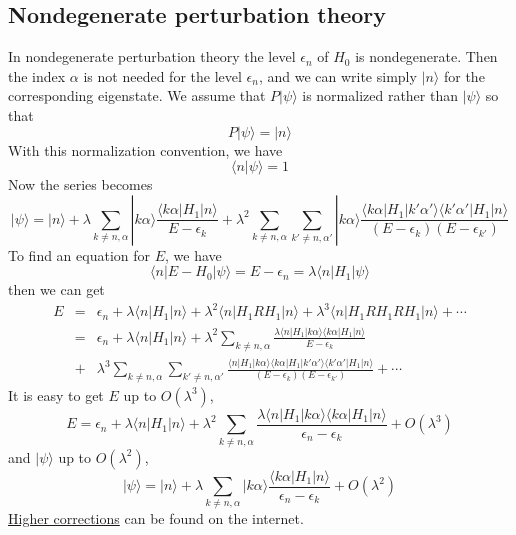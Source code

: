 \documentclass[cyan]{elegantnote}
\begin{document}
\subsection{Nondegenerate perturbation theory}
In nondegenerate perturbation theory the level $\epsilon_n$ of $H_0$ is nondegenerate. Then the index $\alpha$ is not needed for the level $\epsilon_n$, and we can write simply $|n\rangle$ for the corresponding eigenstate. We assume that $P|\psi\rangle$ is normalized rather than $|\psi\rangle$ so that
\[P|\psi\rangle  = |n\rangle\]
With this normalization convention, we have
\[\langle n | \psi \rangle = 1\]
Now the series becomes
\[|\psi\rangle = |n\rangle + \lambda \sum_{k\neq n,\alpha} |k\alpha\rangle \frac{\langle k\alpha | H_1 | n \rangle}{E-\epsilon_k} + \lambda^2 \sum_{k\neq n,\alpha} \sum_{k'\neq n,\alpha'} |k\alpha\rangle \frac{\langle k\alpha | H_1 | k'\alpha' \rangle \langle k'\alpha' | H_1 | n \rangle}{(E-\epsilon_k)(E-\epsilon_{k'})}\]
To find an equation for $E$, we have
\[\langle n | E-H_0 | \psi\rangle = E-\epsilon_n = \lambda \langle n | H_1 | \psi\rangle\]
then we can get
\begin{eqnarray}
E &=& \epsilon_n + \lambda \langle n | H_1 | n\rangle + \lambda^2 \langle n | H_1RH_1 | n\rangle + \lambda^3 \langle n | H_1RH_1RH_1 | n\rangle + \cdots \nonumber \\
&=& \epsilon_n 
+ \lambda \langle n | H_1|n\rangle 
+ \lambda^2 \sum_{k\neq n,\alpha}  \frac{\lambda \langle n | H_1|k\alpha\rangle \langle k\alpha | H_1 | n \rangle}{E-\epsilon_k} \nonumber \\
&+& \lambda^3 \sum_{k\neq n,\alpha} \sum_{k'\neq n,\alpha'} \frac{\langle n | H_1 |k\alpha\rangle \langle k\alpha | H_1 | k'\alpha' \rangle \langle k'\alpha' | H_1 | n \rangle}{(E-\epsilon_k)(E-\epsilon_{k'})} + \cdots \nonumber
\end{eqnarray}
It is easy to get $E$ up to $O(\lambda^3)$,
\[E = \epsilon_n  + \lambda \langle n | H_1|n\rangle  + \lambda^2 \sum_{k\neq n,\alpha}  \frac{\lambda \langle n | H_1|k\alpha\rangle \langle k\alpha | H_1 | n \rangle}{\epsilon_n-\epsilon_k} + O(\lambda^3)\]
and $|\psi\rangle$ up to $O(\lambda^2)$,
\[|\psi\rangle = |n\rangle + \lambda \sum_{k\neq n,\alpha} |k\alpha\rangle \frac{\langle k\alpha | H_1 | n \rangle}{\epsilon_n-\epsilon_k} + O(\lambda^2)\]
\href{https://en.wikipedia.org/wiki/Perturbation_theory_(quantum_mechanics)#Second-order_and_higher_corrections}{Higher corrections} can be found on the internet.
\end{document}
